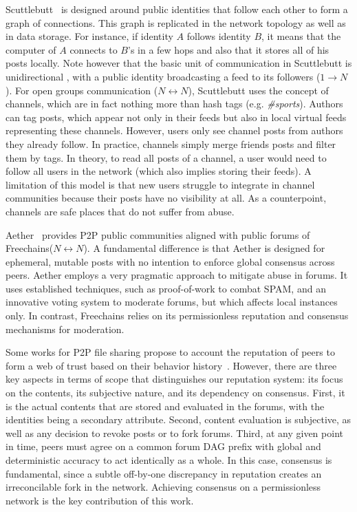 \documentclass[12pt]{article}
\newcommand{\FC}       {Freechains\xspace}
\newcommand{\Xon} {$1{\rightarrow}N$\xspace}
\newcommand{\Xnn} {$N{\leftrightarrow}N$\xspace}
\begin{document}
Scuttlebutt~\cite{p2p.scuttlebutt} is designed around public identities that
follow each other to form a graph of connections.
This graph is replicated in the network topology as well as in data storage.
For instance, if identity $A$ follows identity $B$, it means that the computer
of $A$ connects to $B$'s in a few hops and also that it stores all of his posts
locally.
Note however that the basic unit of communication in Scuttlebutt is
unidirectional , with a public identity broadcasting a feed to its
followers (\Xon).
%
For open groups communication (\Xnn), Scuttlebutt uses the concept of channels,
which are in fact nothing more than hash tags (e.g. \emph{\#sports}).
Authors can tag posts, which appear not only in their feeds but also in local
virtual feeds representing these channels.
However, users only see channel posts from authors they already follow.
In practice, channels simply merge friends posts and filter them by tags.
In theory, to read all posts of a channel, a user would need to follow all
users in the network (which also implies storing their feeds).
A limitation of this model is that new users struggle to integrate in channel
communities because their posts have no visibility at all.
As a counterpoint, channels are safe places that do not suffer from abuse.
%

Aether~\cite{p2p.ecosystem} provides P2P public communities aligned with public
forums of \FC (\Xnn).
A fundamental difference is that Aether is designed for ephemeral, mutable
posts with no intention to enforce global consensus across peers.
Aether employs a very pragmatic approach to mitigate abuse in forums.
It uses established techniques, such as proof-of-work to combat SPAM, and an
innovative voting system to moderate forums, but which affects local instances
only.
In contrast, \FC relies on its permissionless reputation and consensus
mechanisms for moderation.

Some works for P2P file sharing propose to account the reputation of peers to
form a web of trust based on their behavior
history~\cite{p2p.rep.wang,p2p.rep.eigentrust}.
However, there are three key aspects in terms of scope that distinguishes our
reputation system: its focus on the contents, its subjective nature, and its
dependency on consensus.
First, it is the actual contents that are stored and evaluated in the forums,
with the identities being a secondary attribute.
Second, content evaluation is subjective, as well as any decision to revoke
posts or to fork forums.
Third, at any given point in time, peers must agree on a common forum DAG
prefix with global and deterministic accuracy to act identically as a whole.
In this case, consensus is fundamental, since a subtle off-by-one discrepancy
in reputation creates an irreconcilable fork in the network.
Achieving consensus on a permissionless network is the key contribution of this
work.
\end{document}

